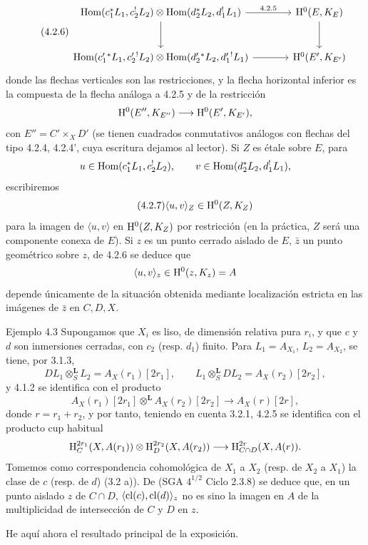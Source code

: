 \begin{equation}
\tag{4.2.6}
\begin{tikzcd}[column sep=large,row sep=large]
\Hom(c_1^*L_1,c_2^!L_2)\otimes\Hom(d_2^*L_2,d_1^!L_1)
  \arrow[r,"4.2.5"] \arrow[d] &
\H^0(E,K_E)\arrow[d] \\
\Hom(c_1'{}^*L_1,c_2'{}^!L_2)\otimes\Hom(d_2'{}^*L_2,d_1'{}^!L_1)
  \arrow[r] &
\H^0(E',K_{E'})
\end{tikzcd}
\end{equation}
donde las flechas verticales son las restricciones, y la flecha horizontal inferior es la compuesta de la flecha análoga a 4.2.5 y de la restricción
\[
\mathrm{H}^0(E'',K_{E''})\longrightarrow \mathrm{H}^0(E',K_{E'}),
\]
con $E''=C'\times_{X}D'$ (se tienen cuadrados conmutativos análogos con flechas del tipo 4.2.4, 4.2.4', cuya escritura dejamos al lector). Si $Z$ es étale sobre $E$, para
\[
u\in\operatorname{Hom}(c_1^*L_1,c_2^!L_2),\qquad
v\in\operatorname{Hom}(d_2^*L_2,d_1^!L_1),
\]
escribiremos
\begin{equation}
\tag{4.2.7}
\langle u,v\rangle_Z\in \mathrm{H}^0(Z,K_Z)
\end{equation}
para la imagen de $\langle u,v\rangle$ en $\mathrm{H}^0(Z,K_Z)$ por restricción (en la práctica, $Z$ será una componente conexa de $E$). Si $z$ es un punto cerrado aislado de $E$, $\bar z$ un punto geométrico sobre $z$, de 4.2.6 se deduce que
\[
\langle u,v\rangle_z\in \mathrm{H}^0(z,K_z)=A
\]
depende únicamente de la situación obtenida mediante localización estricta en las imágenes de $\bar z$ en $C,D,X$.

\begin{statement}{Ejemplo 4.3}
Supongamos que $X_i$ es liso, de dimensión relativa pura $r_i$, y que $c$ y $d$ son inmersiones cerradas, con $c_2$ (resp. $d_1$) finito. Para $L_1=A_{X_1}$, $L_2=A_{X_2}$, se tiene, por 3.1.3,
\[
DL_1\otimes_S^{\mathbf L}L_2=A_X(r_1)[2r_1],\qquad
L_1\otimes_S^{\mathbf L}DL_2=A_X(r_2)[2r_2],
\]
y 4.1.2 se identifica con el producto
\[
A_X(r_1)[2r_1]\otimes^{\mathbf L}A_X(r_2)[2r_2]\longrightarrow A_X(r)[2r],
\]
donde $r=r_1+r_2$, y por tanto, teniendo en cuenta 3.2.1, 4.2.5 se identifica con el producto cup habitual
\[
\mathrm{H}_C^{2r_1}(X,A(r_1))\otimes \mathrm{H}_D^{2r_2}(X,A(r_2))
\longrightarrow
\mathrm{H}_{C\cap D}^{2r}(X,A(r)).
\]
Tomemos como correspondencia cohomológica de $X_1$ a $X_2$ (resp. de $X_2$ a $X_1$) la clase de $c$ (resp. de $d$) (3.2 a)). De (SGA $4^{1/2}$ Ciclo 2.3.8) se deduce que, en un punto aislado $z$ de $C\cap D$, $\langle \operatorname{cl}(c),\operatorname{cl}(d)\rangle_z$ no es sino la imagen en $A$ de la multiplicidad de intersección de $C$ y $D$ en $z$.
\end{statement}

He aquí ahora el resultado principal de la exposición.

